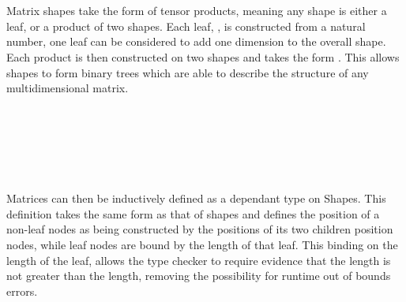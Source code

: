 \begin{AgdaAlign}
\begin{code}[hide]
\\
\>[4][@{}l@{\AgdaIndent{0}}]%
\>[6]\AgdaSpace{}%
\AgdaSpace{}%
\AgdaSymbol{:}\AgdaSpace{}%
\<%
\\
%
\>[6]\AgdaSpace{}%
\AgdaSpace{}%
\AgdaSpace{}%
\AgdaSymbol{:}\AgdaSpace{}%
\<%
\end{code}
Matrix shapes take the form of tensor products, meaning any shape is either a 
leaf, or a product of two shapes.
Each leaf, , is constructed from a natural number, one leaf 
can be considered to add one dimension to the overall shape. 
Each product is then constructed on two shapes and takes the form .
This allows shapes to form binary trees which are able to describe the structure of any
multidimensional matrix.

\begin{code}%
%
\>[2]\AgdaSpace{}%
\AgdaSpace{}%
\AgdaSymbol{:}\AgdaSpace{}%
\AgdaSpace{}%
\<%
\\
\>[2][@{}l@{\AgdaIndent{0}}]%
\>[4]%
\>[8]\AgdaSymbol{:}\AgdaSpace{}%
\AgdaSpace{}%
\AgdaSpace{}%
\<%
\\
%
\>[4]\AgdaSpace{}%
\AgdaSymbol{:}\AgdaSpace{}%
\AgdaSpace{}%
\AgdaSpace{}%
\AgdaSpace{}%
\AgdaSpace{}%
\<%
\end{code}
\begin{code}[hide]%
%
\>[2]\<%
\\
\>[2][@{}l@{\AgdaIndent{0}}]%
\>[4]\<%
\\
\>[4][@{}l@{\AgdaIndent{0}}]%
\>[6]\AgdaSpace{}%
\AgdaSpace{}%
\AgdaSymbol{:}\AgdaSpace{}%
\<%
\end{code}

Matrices can then be inductively defined as a dependant type on Shapes.
This definition takes the same form as that of shapes and defines the position 
of a non-leaf nodes as being constructed by the positions of its two children 
position nodes, while leaf nodes are bound by the length of that leaf.
This binding on the length of the leaf, allows the type checker to require
evidence that the length is not greater than the length, removing the possibility
for runtime out of bounds errors.



\end{AgdaAlign}

